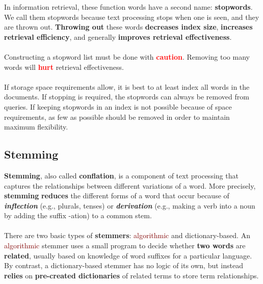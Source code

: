 In information retrieval, these function words have a second name: \textbf{\textcolor{NavyBlue}{stopwords}}. We call them \textcolor{NavyBlue}{stopwords} because text processing stops when one is seen, and they are thrown out. \textbf{Throwing out} these words \textbf{decreases index size}, \textbf{increases retrieval efficiency}, and generally \textbf{improves retrieval effectiveness}.
\\
\\
Constructing a stopword list must be done with \textbf{\textcolor{Red}{caution}}. Removing too many words will \textbf{\textcolor{Red}{hurt}} retrieval effectiveness.
\\
\\
If storage space requirements allow, it is best to at least index all words in the documents. If stopping is required, the stopwords can always be removed from queries. If keeping stopwords in an index is not possible because of space requirements, as few as possible should be removed in order to maintain maximum flexibility.

\subsection{Stemming}
\textbf{\textcolor{PineGreen}{Stemming}}, also called \textbf{\textcolor{PineGreen}{conflation}}, is a component of text processing that captures the relationships between different variations of a word. More precisely, \textbf{\textcolor{PineGreen}{stemming}} \textbf{reduces} the different forms of a word that occur because of \textbf{\textit{inflection}} (e.g., plurals, tenses) or \textbf{\textit{derivation}} (e.g., making a verb into a noun by adding the suffix -ation) to a common stem.
\\
\\
There are two basic types of \textbf{stemmers}: \textcolor{Maroon}{algorithmic} and \textcolor{NavyBlue}{dictionary}-based. An \textcolor{Maroon}{algorithmic} stemmer uses a small program to decide whether \textbf{two words} are \textbf{related}, usually based on knowledge of word suffixes for a particular language. By contrast, a \textcolor{NavyBlue}{dictionary}-based stemmer has no logic of its own, but instead \textbf{relies} on \textbf{pre-created dictionaries} of related terms to store term relationships.
\\

